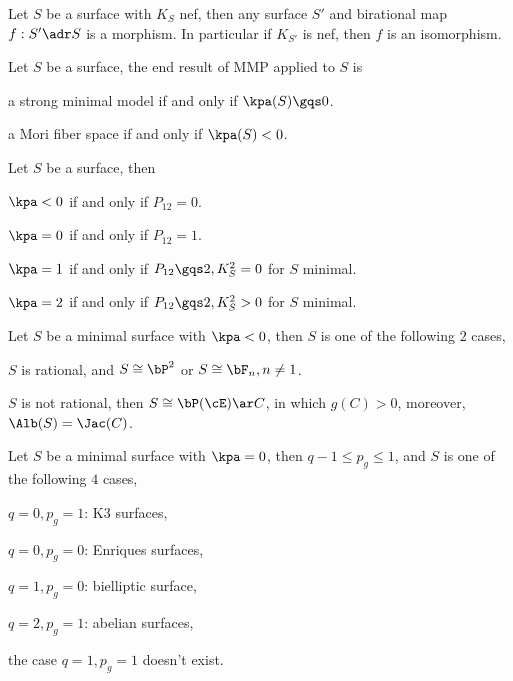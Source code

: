 \documentclass[a4paper, twoside]{article}
\begin{document}
\begin{thm}
	Let $S$ be a surface with $K_{S}$ nef, then any surface $S'$ and birational map $f:S'\adr S$ is a morphism. In particular if $K_{S'}$ is nef, then $f$ is an isomorphism.
\end{thm}

\begin{thm}
	Let $S$ be a surface, the end result of MMP applied to $S$ is
	\begin{enr}
		\item a strong minimal model if and only if $\kpa(S)\gqs0$.
		\item a Mori fiber space if and only if $\kpa(S)<0$.
	\end{enr}
\end{thm}



\begin{thm}[$P_{12}$-theorem]
	Let $S$ be a surface, then
	\begin{enr}
		\item $\kpa<0$ if and only if $P_{12}=0$.
		\item $\kpa=0$ if and only if $P_{12}=1$.
		\item $\kpa=1$ if and only if $P_{12}\gqs2, K_{S}^{2}=0$ for $S$ minimal.
		\item $\kpa=2$ if and only if $P_{12}\gqs2, K_{S}^{2}>0$ for $S$ minimal.
	\end{enr}
\end{thm}

\begin{thm}
	Let $S$ be a minimal surface with $\kpa<0$, then $S$ is one of the following $2$ cases,
	\begin{enr}
		\item $S$ is rational, and $S\cong\bP^{2}$ or $S\cong\bF_{n}, n\neq1$.
		\item $S$ is not rational, then $S\cong\bP(\cE)\ar C$, in which $g(C)>0$, moreover, $\Alb(S)=\Jac(C)$.
	\end{enr}
\end{thm}

\begin{thm}
	Let $S$ be a minimal surface with $\kpa=0$, then $q-1\leq p_{g}\leq1$, and $S$ is one of the following $4$ cases,
	\begin{enr}
		\item $q=0, p_{g}=1$: K3 surfaces,
		\item $q=0, p_{g}=0$: Enriques surfaces,
		\item $q=1, p_{g}=0$: bielliptic surface,
		\item $q=2, p_{g}=1$: abelian surfaces,
	\end{enr}
	the case $q=1,p_{g}=1$ doesn't exist.
\end{thm}
\end{document}
